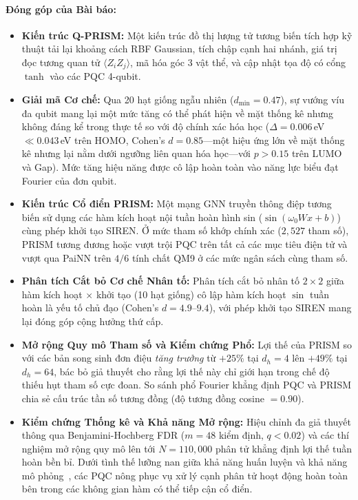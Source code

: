 \documentclass[10pt,twocolumn,letterpaper]{article}
\begin{document}
\paragraph{Đóng góp của Bài báo:}
\begin{itemize}
    \item \textbf{Kiến trúc Q-PRISM:} Một kiến trúc đồ thị lượng tử tương biến tích hợp kỹ thuật tải lại khoảng cách RBF Gaussian, tích chập cạnh hai nhánh, giá trị đọc tương quan tử $\langle Z_i Z_j \rangle$, mã hóa góc 3 vật thể, và cập nhật tọa độ có cổng $\tanh$ vào các PQC 4-qubit.
    \item \textbf{Giải mã Cơ chế:} Qua 20 hạt giống ngẫu nhiên ($d_{\min} = 0.47$), sự vướng víu đa qubit mang lại một mức tăng có thể phát hiện về mặt thống kê nhưng không đáng kể trong thực tế so với độ chính xác hóa học ($\Delta = 0.006$\,eV $\ll 0.043$\,eV trên HOMO, Cohen's $d = 0.85$---một hiệu ứng lớn về mặt thống kê nhưng lại nằm dưới ngưỡng liên quan hóa học---với $p > 0.15$ trên LUMO và Gap). Mức tăng hiệu năng được cô lập hoàn toàn vào năng lực biểu đạt Fourier của đơn qubit.
    \item \textbf{Kiến trúc Cổ điển PRISM:} Một mạng GNN truyền thông điệp tương biến sử dụng các hàm kích hoạt nội tuần hoàn hình sin ($\sin(\omega_0 W x + b)$) cùng phép khởi tạo SIREN. Ở mức tham số khớp chính xác ($2{,}527$ tham số), PRISM tương đương hoặc vượt trội PQC trên tất cả các mục tiêu điện tử và vượt qua PaiNN trên $4/6$ tính chất QM9 ở các mức ngân sách cùng tham số.
    \item \textbf{Phân tích Cắt bỏ Cơ chế Nhân tố:} Phân tích cắt bỏ nhân tố $2 \times 2$ giữa hàm kích hoạt $\times$ khởi tạo (10 hạt giống) cô lập hàm kích hoạt $\sin$ tuần hoàn là yếu tố chủ đạo (Cohen's $d = 4.9$--$9.4$), với phép khởi tạo SIREN mang lại đóng góp cộng hưởng thứ cấp.
    \item \textbf{Mở rộng Quy mô Tham số và Kiểm chứng Phổ:} Lợi thế của PRISM so với các bản song sinh đơn điệu \textit{tăng trưởng} từ $+25\%$ tại $d_h = 4$ lên $+49\%$ tại $d_h = 64$, bác bỏ giả thuyết cho rằng lợi thế này chỉ giới hạn trong chế độ thiếu hụt tham số cực đoan. So sánh phổ Fourier khẳng định PQC và PRISM chia sẻ cấu trúc tần số tương đồng (độ tương đồng cosine $= 0.90$).
    \item \textbf{Kiểm chứng Thống kê và Khả năng Mở rộng:} Hiệu chỉnh đa giả thuyết thông qua Benjamini-Hochberg FDR ($m = 48$ kiểm định, $q < 0.02$) và các thí nghiệm mở rộng quy mô lên tới $N = 110{,}000$ phân tử khẳng định lợi thế tuần hoàn bền bỉ. Dưới tình thế lưỡng nan giữa khả năng huấn luyện và khả năng mô phỏng~\cite{Cerezo:2023nqf}, các PQC nông phục vụ xử lý cạnh phân tử hoạt động hoàn toàn bên trong các không gian hàm có thể tiếp cận cổ điển.
\end{itemize}
\end{document}
